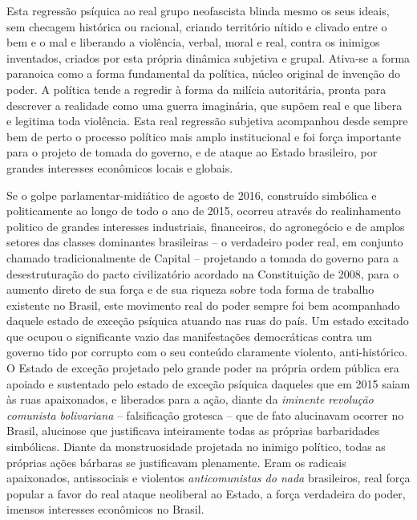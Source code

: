 Esta regressão psíquica ao real grupo neofascista blinda mesmo os seus
ideais, sem checagem histórica ou racional, criando território nítido e
clivado entre o bem e o mal e liberando a violência, verbal, moral e
real, contra os inimigos inventados, criados por esta própria dinâmica
subjetiva e grupal. Ativa-se a forma paranoica como a forma fundamental
da política, núcleo original de invenção do poder. A política tende a
regredir à forma da milícia autoritária, pronta para descrever a
realidade como uma guerra imaginária, que supõem real e que libera e
legitima toda violência. Esta real regressão subjetiva acompanhou desde
sempre bem de perto o processo político mais amplo institucional e foi
força importante para o projeto de tomada do governo, e de ataque ao
Estado brasileiro, por grandes interesses econômicos locais e globais.

Se o golpe parlamentar-midiático de agosto de 2016, construído simbólica
e politicamente ao longo de todo o ano de 2015, ocorreu através do
realinhamento politico de grandes interesses industriais, financeiros,
do agronegócio e de amplos setores das classes dominantes brasileiras --
o verdadeiro poder real, em conjunto chamado tradicionalmente de Capital
-- projetando a tomada do governo para a desestruturação do pacto
civilizatório acordado na Constituição de 2008, para o aumento direto de
sua força e de sua riqueza sobre toda forma de trabalho existente no
Brasil, este movimento real do poder sempre foi bem acompanhado daquele
estado de exceção psíquica atuando nas ruas do país. Um estado excitado
que ocupou o significante vazio das manifestações democráticas contra um
governo tido por corrupto com o seu conteúdo claramente violento,
anti-histórico. O Estado de exceção projetado pelo grande poder na
própria ordem pública era apoiado e sustentado pelo estado de exceção
psíquica daqueles que em 2015 saiam às ruas apaixonados, e liberados
para a ação, diante da \emph{iminente revolução comunista bolivariana}
-- falsificação grotesca -- que de fato alucinavam ocorrer no Brasil,
alucinose que justificava inteiramente todas as próprias barbaridades
simbólicas. Diante da monstruosidade projetada no inimigo político,
todas as próprias ações bárbaras se justificavam plenamente. Eram os
radicais apaixonados, antissociais e violentos \emph{anticomunistas do
nada} brasileiros, real força popular a favor do real ataque neoliberal
ao Estado, a força verdadeira do poder, imensos interesses econômicos no
Brasil.

